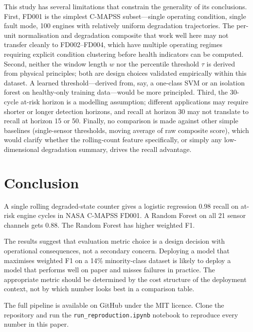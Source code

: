 \documentclass[10pt,twocolumn]{article}
\begin{document}
This study has several limitations that constrain the generality of its conclusions.
First, FD001 is the simplest C-MAPSS subset---single operating condition, single fault
mode, 100 engines with relatively uniform degradation trajectories.
The per-unit normalisation and degradation composite that work well here may not
transfer cleanly to FD002--FD004, which have multiple operating regimes requiring
explicit condition clustering before health indicators can be computed.
Second, neither the window length $w$ nor the percentile threshold $\tau$ is derived
from physical principles; both are design choices validated empirically within this
dataset.
A learned threshold---derived from, say, a one-class SVM or an isolation forest on
healthy-only training data---would be more principled.
Third, the 30-cycle at-risk horizon is a modelling assumption; different applications
may require shorter or longer detection horizons, and recall at horizon 30 may not
translate to recall at horizon 15 or 50.
Finally, no comparison is made against other simple baselines (single-sensor
thresholds, moving average of raw composite score), which would clarify whether the
rolling-count feature specifically, or simply any low-dimensional degradation
summary, drives the recall advantage.





\section{Conclusion}
\label{sec:conclusion}

A single rolling degraded-state counter gives a logistic regression 0.98 recall on
at-risk engine cycles in NASA C-MAPSS FD001.
A Random Forest on all 21 sensor channels gets 0.88.
The Random Forest has higher weighted F1.

The results suggest that evaluation metric choice is a design decision with operational
consequences, not a secondary concern.
Deploying a model that maximises weighted F1 on a 14\% minority-class dataset is likely
to deploy a model that performs well on paper and misses failures in practice.
The appropriate metric should be determined by the cost structure of the deployment
context, not by which number looks best in a comparison table.

The full pipeline is available on GitHub under the MIT licence.
Clone the repository and run the \texttt{run\_reproduction.ipynb} notebook to reproduce
every number in this paper.
\end{document}
